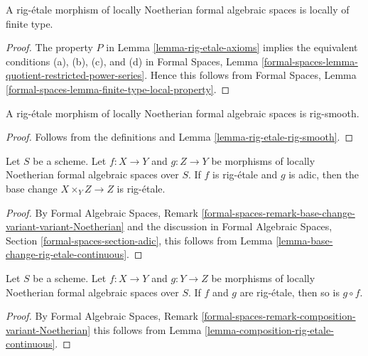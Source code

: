 \begin{lemma}
\label{lemma-rig-etale-finite-type}
A rig-\'etale morphism of locally Noetherian formal algebraic spaces
is locally of finite type.
\end{lemma}

\begin{proof}
The property $P$ in Lemma \ref{lemma-rig-etale-axioms}
implies the equivalent conditions (a), (b), (c), and (d) in
Formal Spaces, Lemma
\ref{formal-spaces-lemma-quotient-restricted-power-series}.
Hence this follows from
Formal Spaces, Lemma \ref{formal-spaces-lemma-finite-type-local-property}.
\end{proof}

\begin{lemma}
\label{lemma-rig-etale-rig-smooth-morphism}
A rig-\'etale morphism of locally Noetherian formal algebraic spaces
is rig-smooth.
\end{lemma}

\begin{proof}
Follows from the definitions and
Lemma \ref{lemma-rig-etale-rig-smooth}.
\end{proof}

\begin{lemma}
\label{lemma-base-change-rig-etale}
Let $S$ be a scheme. Let $f : X \to Y$ and $g : Z \to Y$
be morphisms of locally Noetherian formal algebraic spaces over $S$.
If $f$ is rig-\'etale and $g$ is adic, then the base change
$X \times_Y Z \to Z$ is rig-\'etale.
\end{lemma}

\begin{proof}
By Formal Algebraic Spaces, Remark
\ref{formal-spaces-remark-base-change-variant-variant-Noetherian}
and the discussion in Formal Algebraic Spaces, Section
\ref{formal-spaces-section-adic},
this follows from Lemma \ref{lemma-base-change-rig-etale-continuous}.
\end{proof}

\begin{lemma}
\label{lemma-composition-rig-etale}
Let $S$ be a scheme. Let $f : X \to Y$ and $g : Y \to Z$
be morphisms of locally Noetherian formal algebraic spaces over $S$.
If $f$ and $g$ are rig-\'etale, then so is $g \circ f$.
\end{lemma}

\begin{proof}
By Formal Algebraic Spaces, Remark
\ref{formal-spaces-remark-composition-variant-Noetherian}
this follows from Lemma \ref{lemma-composition-rig-etale-continuous}.
\end{proof}

